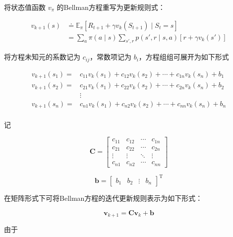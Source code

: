 将状态值函数 $v_\pi$ 的Bellman方程重写为更新规则式：

\begin{equation}
\begin{aligned}v_{k+1}(s) &\doteq \mathbb{E}_\pi[R_{t+1}+\gamma v_k(S_{t+1}) \mid S_t=s] \\ &= \sum_a\pi(a\mid s)\sum_{s',r}p(s',r \mid s,a)[r+\gamma v_k(s')]\end{aligned}
\end{equation}

将方程未知元的系数记为 $c_{ij}$，常数项记为 $b_i$，方程组组可展开为如下形式

\begin{equation}
\begin{aligned}
v_{k+1}(s_1)=&c_{11}v_k(s_1)+c_{12}v_k(s_2)+\cdots+c_{1n}v_k(s_n)+b_1\\
v_{k+1}(s_2)= & c_{21}v_k(s_1)+c_{22}v_k(s_2)+\cdots+c_{2n}v_k(s_n)+b_2\\
&\vdots\\
v_{k+1}(s_n)= & c_{n1}v_k(s_1)+c_{n2}v_k(s_2)+\cdots+c_{nn}v_k(s_n)+b_n\\
\end{aligned}
\end{equation}

记

\begin{equation}
\boldsymbol{C} =
\begin{bmatrix}
c_{11} & c_{12} & \cdots & c_{1n}  \\
c_{21} & c_{22} & \cdots & c_{2n}  \\
\vdots & \vdots & \ddots & \vdots  \\
c_{n1} & c_{n2} & \cdots & c_{nn}
\end{bmatrix}
\end{equation}

\begin{equation}
\boldsymbol{b} =
    \begin{bmatrix}
    b_{1} & b_{2} & \vdots & b_{n} 
    \end{bmatrix}^{\mathrm{T}}
\end{equation}

在矩阵形式下可将Bellman方程的迭代更新规则表示为如下形式：

\begin{equation}\label{eq:bellman-update}
    \boldsymbol{v}_{k+1} =\boldsymbol{Cv}_k+\boldsymbol{b}
\end{equation}

由于

